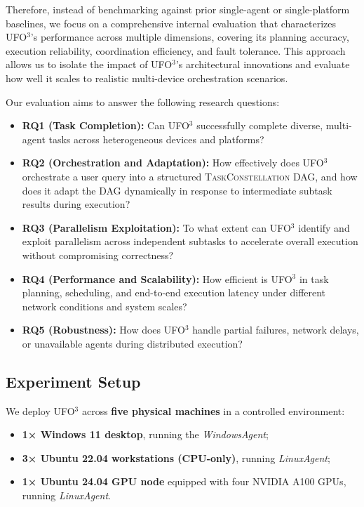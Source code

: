 \documentclass[10pt]{article} %
\newcommand{\ufo}{\textsc{UFO}$^3$\xspace}
\newcommand{\TaskConstellation}{\textsc{TaskConstellation}\xspace}
\begin{document}
Therefore, instead of benchmarking against prior single-agent or single-platform baselines, we focus on a comprehensive internal evaluation that characterizes \ufo's performance across multiple dimensions, covering its planning accuracy, execution reliability, coordination efficiency, and fault tolerance. This approach allows us to isolate the impact of \ufo's architectural innovations and evaluate how well it scales to realistic multi-device orchestration scenarios.


Our evaluation aims to answer the following research questions:

\begin{itemize}%
    \item \textbf{RQ1 (Task Completion):} Can \ufo successfully complete diverse, multi-agent tasks across heterogeneous devices and platforms?
    \item \textbf{RQ2 (Orchestration and Adaptation):} How effectively does \ufo orchestrate a user query into a structured \TaskConstellation DAG, and how does it adapt the DAG dynamically in response to intermediate subtask results during execution?
    \item \textbf{RQ3 (Parallelism Exploitation):} To what extent can \ufo identify and exploit parallelism across independent subtasks to accelerate overall execution without compromising correctness?
    \item \textbf{RQ4 (Performance and Scalability):} How efficient is \ufo in task planning, scheduling, and end-to-end execution latency under different network conditions and system scales?
    \item \textbf{RQ5 (Robustness):} How does \ufo handle partial failures, network delays, or unavailable agents during distributed execution?
\end{itemize}

\subsection{Experiment Setup}
\label{sec:setup}

We deploy \ufo across \textbf{five physical machines} in a controlled environment:
\begin{itemize}%
    \item \textbf{1× Windows 11 desktop}, running the \textit{WindowsAgent};
    \item \textbf{3× Ubuntu 22.04 workstations (CPU-only)}, running \textit{LinuxAgent};
    \item \textbf{1× Ubuntu 24.04 GPU node} equipped with four NVIDIA A100 GPUs, running \textit{LinuxAgent}.
\end{itemize}
\end{document}
